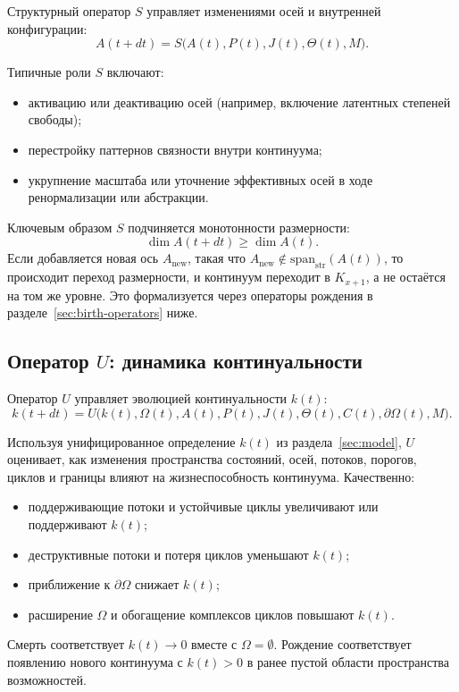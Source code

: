 Структурный оператор \(S\) управляет изменениями осей и внутренней
конфигурации:
\[
  A(t+dt) = S\big(A(t), P(t), J(t), \Theta(t), M\big).
\]

Типичные роли \(S\) включают:
\begin{itemize}
  \item активацию или деактивацию осей (например, включение латентных степеней
        свободы);
  \item перестройку паттернов связности внутри континуума;
  \item укрупнение масштаба или уточнение эффективных осей в ходе
        ренормализации или абстракции.
\end{itemize}

Ключевым образом \(S\) подчиняется монотонности размерности:
\[
  \dim A(t+dt) \ge \dim A(t).
\]
Если добавляется новая ось \(A_{\mathrm{new}}\), такая что
\(A_{\mathrm{new}} \notin \mathrm{span}_{\mathrm{str}}(A(t))\), то
происходит переход размерности, и континуум переходит в \(K_{x+1}\), а не
остаётся на том же уровне. Это формализуется через операторы рождения в
разделе~\ref{sec:birth-operators} ниже.

\subsection{Оператор \texorpdfstring{\texorpdfstring{$U$}{U}}{U}: динамика
континуальности}

Оператор \(U\) управляет эволюцией континуальности \(k(t)\):
\[
  k(t+dt) =
  U\big(k(t), \Omega(t), A(t), P(t), J(t),
        \Theta(t), C(t), \partial\Omega(t), M\big).
\]

Используя унифицированное определение \(k(t)\) из раздела~\ref{sec:model},
\(U\) оценивает, как изменения пространства состояний, осей, потоков,
порогов, циклов и границы влияют на жизнеспособность континуума. Качественно:
\begin{itemize}
  \item поддерживающие потоки и устойчивые циклы увеличивают или поддерживают
        \(k(t)\);
  \item деструктивные потоки и потеря циклов уменьшают \(k(t)\);
  \item приближение к \(\partial\Omega\) снижает \(k(t)\);
  \item расширение \(\Omega\) и обогащение комплексов циклов повышают
        \(k(t)\).
\end{itemize}

Смерть соответствует \(k(t) \to 0\) вместе с \(\Omega = \emptyset\).
Рождение соответствует появлению нового континуума с \(k(t) > 0\) в
ранее пустой области пространства возможностей.

